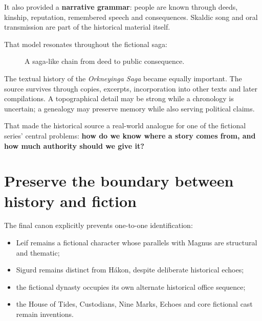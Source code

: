\documentclass[11pt,oneside,openany]{book}
\providecommand{\tightlist}{%
  \setlength{\itemsep}{0pt}\setlength{\parskip}{0pt}}
\begin{document}
It also provided a \textbf{narrative grammar}: people are known through deeds, kinship, reputation, remembered speech and consequences. Skaldic song and oral transmission are part of the historical material itself.

That model resonates throughout the fictional saga:

\begin{figure}[htbp]
\centering
{}
\caption{A saga-like chain from deed to public consequence.}
\end{figure}

The textual history of the \emph{Orkneyinga Saga} became equally important. The source survives through copies, excerpts, incorporation into other texts and later compilations. A topographical detail may be strong while a chronology is uncertain; a genealogy may preserve memory while also serving political claims.

That made the historical source a real-world analogue for one of the fictional series' central problems: \textbf{how do we know where a story comes from, and how much authority should we give it?}

\section{Preserve the boundary between history and fiction}\label{preserve-the-boundary-between-history-and-fiction}

The final canon explicitly prevents one-to-one identification:

\begin{itemize}
\tightlist
\item
  Leif remains a fictional character whose parallels with Magnus are structural and thematic;
\item
  Sigurd remains distinct from Hákon, despite deliberate historical echoes;
\item
  the fictional dynasty occupies its own alternate historical office sequence;
\item
  the House of Tides, Custodians, Nine Marks, Echoes and core fictional cast remain inventions.
\end{itemize}
\end{document}
